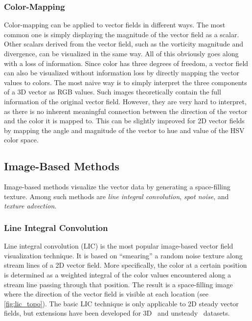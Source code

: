 %
\subsubsection{Color-Mapping}
%
Color-mapping can be applied to vector fields in different ways.
%
The most common one is simply displaying the magnitude of the vector field as a
scalar.
%
Other scalars derived from the vector field, such as the vorticity magnitude and
divergence, can be visualized in the same way.
%
All of this obviously goes along with a loss of information.
%
Since color has three degrees of freedom, a vector field can also be visualized
without information loss by directly mapping the vector values to colors.
%
The most naive way is to simply interpret the three components of a \ac{3D}
vector as RGB values.
%
Such images theoretically contain the full information of the original vector
field.
%
However, they are very hard to interpret, as there is no inherent meaningful
connection between the direction of the vector and the color it is mapped to.
%
This can be slightly improved for \ac{2D} vector fields by mapping the angle
and magnitude of the vector to hue and value of the HSV color space.
%
%
\subsection{Image-Based Methods} %
\label{sub:vector_image_based}
%
Image-based methods visualize the vector data by generating a space-filling
texture.
%
Among such methods are \emph{line integral convolution}, \emph{spot noise},
and \emph{texture advection}.
%

%
\subsubsection{Line Integral Convolution}
%
Line integral convolution (\acs{LIC})\cite{Cabral1993} is the most
popular image-based vector field visualization technique.
%
It is based on ``smearing'' a random noise texture along stream lines of a
\ac{2D} vector field.
%
More specifically, the color at a certain position is determined as a weighted
integral of the color values encountered along a stream line passing through
that position.
%
The result is a space-filling image where the direction of the vector field is
visible at each location (see \cref{fig:lic_topo}).
%
The basic \ac{LIC} technique is only applicable to \ac{2D} steady vector fields,
but extensions have been developed for \ac{3D}~\cite{Rezk-Salama1999} and
unsteady~\cite{Shen1997} datasets.
%

